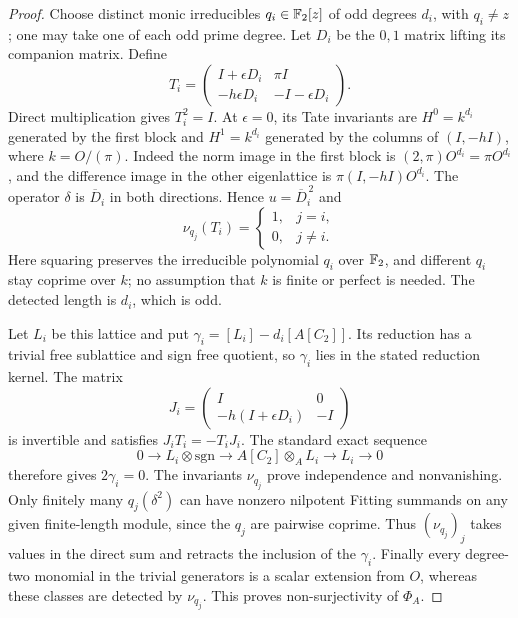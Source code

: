 \begin{proof}
Choose distinct monic irreducibles $q_i\in\mathbb F_2[z]$ of odd degrees
$d_i$, with $q_i\ne z$; one may take one of each odd prime degree.
Let $D_i$ be the $0,1$ matrix lifting its companion matrix.  Define
\[
 T_i=\begin{pmatrix}
 I+\epsilon D_i&\pi I\\
 -h\epsilon D_i&-I-\epsilon D_i
 \end{pmatrix}.
\]
Direct multiplication gives $T_i^2=I$.  At $\epsilon=0$, its Tate
invariants are $H^0=k^{d_i}$ generated by the first block and
$H^1=k^{d_i}$ generated by the columns of $(I,-hI)$, where
$k=O/(\pi)$.  Indeed the norm image in the first block is
$(2,\pi)O^{d_i}=\pi O^{d_i}$, and the difference image in the other
eigenlattice is $\pi(I,-hI)O^{d_i}$.
The operator $\delta$ is $\overline D_i$ in both directions.  Hence
$u=\overline D_i^{\,2}$ and
\[
 \nu_{q_j}(T_i)=\begin{cases}1,&j=i,\\0,&j\ne i.\end{cases}
\]
Here squaring preserves the irreducible polynomial $q_i$ over
$\mathbb F_2$, and different $q_i$ stay coprime over $k$; no assumption that
$k$ is finite or perfect is needed.  The detected length is $d_i$,
which is odd.

Let $L_i$ be this lattice and put
$\gamma_i=[L_i]-d_i[A[C_2]]$.
Its reduction has a trivial free sublattice and sign free quotient,
so $\gamma_i$ lies in the stated reduction kernel.  The matrix
\[
 J_i=\begin{pmatrix}I&0\\-h(I+\epsilon D_i)&-I\end{pmatrix}
\]
is invertible and satisfies $J_iT_i=-T_iJ_i$.
The standard exact sequence
\[
 0\longrightarrow L_i\otimes\mathrm{sgn}
 \longrightarrow A[C_2]\otimes_A L_i
 \longrightarrow L_i\longrightarrow0
\]
therefore gives $2\gamma_i=0$.
The invariants $\nu_{q_j}$ prove independence and nonvanishing.
Only finitely many $q_j(\delta^2)$ can have nonzero nilpotent Fitting
summands on any given finite-length module, since the $q_j$ are
pairwise coprime.  Thus $(\nu_{q_j})_j$ takes values in the direct sum
and retracts the inclusion of the $\gamma_i$.
Finally every degree-two monomial in the trivial generators is a
scalar extension from $O$, whereas these classes are detected by
$\nu_{q_j}$.  This proves non-surjectivity of $\Phi_A$.
\end{proof}

